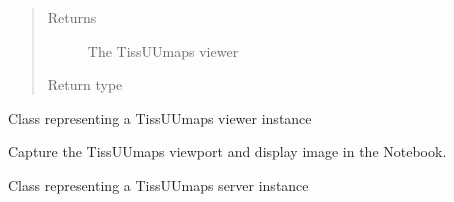 \documentclass[letterpaper,10pt,english,openany,oneside]{sphinxmanual}
\begin{document}
\begin{fulllineitems}
\begin{quote}
\begin{description}
\item[{Returns}] \leavevmode
\sphinxAtStartPar
The TissUUmaps viewer

\item[{Return type}] \leavevmode
\sphinxAtStartPar
{\hyperref[\detokenize{docs/advanced/jupyter:tissuumaps.jupyter.TissUUmapsViewer}]{}}

\end{description}\end{quote}

\end{fulllineitems}


\begin{fulllineitems}
\label{\detokenize{docs/advanced/jupyter:tissuumaps.jupyter.TissUUmapsViewer}}
\pysigstartsignatures
{}
\pysigstopsignatures
\sphinxAtStartPar
Class representing a TissUUmaps viewer instance

\begin{fulllineitems}
\label{\detokenize{docs/advanced/jupyter:tissuumaps.jupyter.TissUUmapsViewer.screenshot}}
\pysigstartsignatures
{}
\pysigstopsignatures
\sphinxAtStartPar
Capture the TissUUmaps viewport and display image in the Notebook.

\end{fulllineitems}


\end{fulllineitems}


\begin{fulllineitems}
\label{\detokenize{docs/advanced/jupyter:tissuumaps.jupyter.TissUUmapsServer}}
\pysigstartsignatures
{}
\pysigstopsignatures
\sphinxAtStartPar
Class representing a TissUUmaps server instance

\end{fulllineitems}
\end{document}
